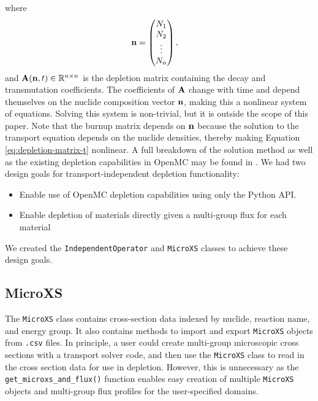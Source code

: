     where
    \begin{equation}
      \mathbf{n} = \begin{pmatrix} N_1 \\ N_2 \\ \vdots \\ N_n \end{pmatrix}, \quad
    \end{equation}
    and $\mathbf{A}(\mathbf{n},t) \in \mathbb{R}^{n\times n}$ is the depletion
    matrix containing the decay and transmutation coefficients. The coefficients
    of $\mathbf{A}$ change with time and depend themselves on the nuclide
    composition vector $\mathbf{n}$, making this a nonlinear system of equations.
    Solving this system is non-trivial, but it is outside the scope of this paper.
    Note that the burnup matrix depends on $\mathbf{n}$ because the solution to
    the transport equation depends on the nuclide densities, thereby making
    Equation \ref{eq:depletion-matrix-t} nonlinear. A full breakdown of the
    solution method as well as the existing depletion capabilities in OpenMC may
    be found in \cite{romano_depletion_2021}.  We had two design goals for
    transport-independent depletion functionality:
    \begin{itemize}
        \item Enable use of OpenMC depletion capabilities using only the Python API.
        \item Enable depletion of materials directly given a multi-group flux
            for each material 
    \end{itemize}
    
    We created the \verb.IndependentOperator. and \verb.MicroXS. classes to
    achieve these design goals.    
    \subsection{MicroXS}
        \label{sub:microxs}
        The \verb.MicroXS. class contains cross-section data indexed by nuclide,
        reaction name, and energy group. It also contains methods to import and
        export \verb.MicroXS. objects from \verb,.csv, files. In principle, a
        user could create multi-group microscopic cross sections with a
        transport solver code, and then use the \verb.MicroXS.  class to read in
        the cross section data for use in depletion. However, this is unnecessary
        as the \verb.get_microxs_and_flux(). function enables easy creation of
        multiple \verb.MicroXS. objects and multi-group flux profiles for the
        user-specified domains.

